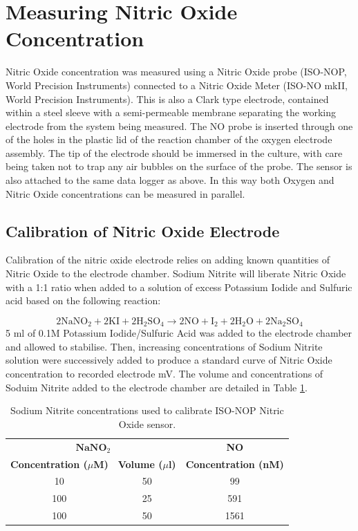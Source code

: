 \section{Measuring Nitric Oxide Concentration}
Nitric Oxide concentration was measured using a Nitric Oxide probe (ISO-NOP, World Precision Instruments) connected to a Nitric Oxide Meter (ISO-NO mkII, World Precision Instruments). This is also a Clark type electrode, contained within a steel sleeve with a semi-permeable membrane separating the working electrode from the system being measured\cite{Liu2005,Bedioui2003,Serpe2007}. The NO probe is inserted through one of the holes in the plastic lid of the reaction chamber of the oxygen electrode assembly. The tip of the electrode should be immersed in the culture, with care being taken not to trap any air bubbles on the surface of the probe. The sensor is also attached to the same data logger as above. In this way both Oxygen and Nitric Oxide concentrations can be measured in parallel.

\subsection{Calibration of Nitric Oxide Electrode}
Calibration of the nitric oxide electrode relies on adding known quantities of Nitric Oxide to the electrode chamber. Sodium Nitrite will liberate Nitric Oxide with a 1:1 ratio when added to a solution of excess Potassium Iodide and Sulfuric acid based on the following reaction:

\begin{equation}
2\mathrm{NaNO}_2 + 2\mathrm{KI} + 2 \mathrm{H}_2\mathrm{SO}_4 \longrightarrow 2\mathrm{NO} + \mathrm{I}_2 + 2\mathrm{H}_2\mathrm{O} + 2\mathrm{Na}_2\mathrm{SO}_4
\end{equation}
5 ml of 0.1M Potassium Iodide/Sulfuric Acid was added to the electrode chamber and allowed to stabilise. Then, increasing concentrations of Sodium Nitrite solution were successively added to produce a standard curve of Nitric Oxide concentration to recorded electrode mV. The volume and concentrations of Soduim Nitrite added to the electrode chamber are detailed in Table \ref{tab:sodiumnitrite}.

\begin{table}[here]
\begin{center}
\begin{tabular}{ccc}
\toprule
\multicolumn{2}{c}{$\mathbf{NaNO}_2$} & \textbf{NO} \\
\textbf{Concentration ($\mu$M)} & \textbf{Volume ($\mu$l)} & \textbf{Concentration (nM)} \\
\midrule
10 & 50 & 99 \\
100 & 25 & 591 \\
100 & 50 & 1561 \\
\bottomrule
\end{tabular} 
\end{center}
\caption{Sodium Nitrite concentrations used to calibrate ISO-NOP Nitric Oxide sensor.
\label{tab:sodiumnitrite}}
\end{table}

